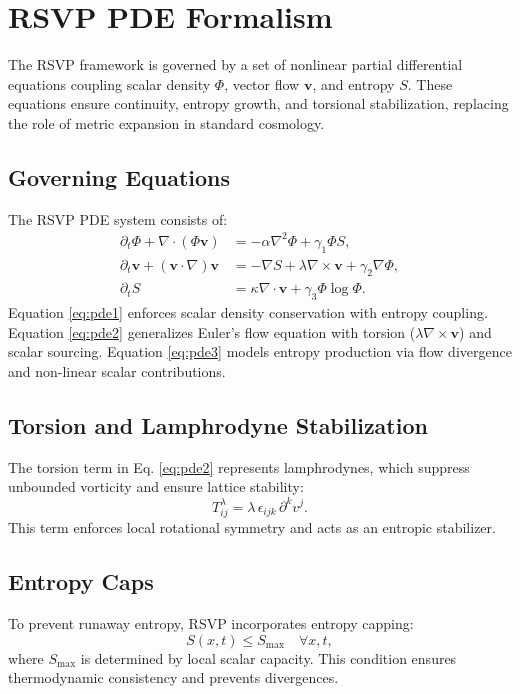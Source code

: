 \documentclass[12pt]{report}
\begin{document}
\chapter{RSVP PDE Formalism}
\label{chap:pde-formalism}
The RSVP framework is governed by a set of nonlinear partial differential equations coupling scalar density \(\Phi\), vector flow \(\mathbf{v}\), and entropy \(S\). These equations ensure continuity, entropy growth, and torsional stabilization, replacing the role of metric expansion in standard cosmology.

\section{Governing Equations}
The RSVP PDE system consists of:
\begin{align}
\partial_t \Phi + \nabla \cdot (\Phi \mathbf{v}) &= -\alpha \nabla^2 \Phi + \gamma_1 \Phi S, \label{eq:pde1} \\
\partial_t \mathbf{v} + (\mathbf{v}\cdot\nabla)\mathbf{v} &= -\nabla S + \lambda \nabla \times \mathbf{v} + \gamma_2 \nabla \Phi, \label{eq:pde2} \\
\partial_t S &= \kappa \nabla \cdot \mathbf{v} + \gamma_3 \Phi \log \Phi. \label{eq:pde3}
\end{align}
Equation \eqref{eq:pde1} enforces scalar density conservation with entropy coupling. Equation \eqref{eq:pde2} generalizes Euler’s flow equation with torsion (\(\lambda \nabla \times \mathbf{v}\)) and scalar sourcing. Equation \eqref{eq:pde3} models entropy production via flow divergence and non-linear scalar contributions.

\section{Torsion and Lamphrodyne Stabilization}
The torsion term in Eq. \eqref{eq:pde2} represents lamphrodynes, which suppress unbounded vorticity and ensure lattice stability:
\begin{equation}
T_{ij}^\lambda = \lambda \, \epsilon_{ijk} \, \partial^k v^j.
\end{equation}
This term enforces local rotational symmetry and acts as an entropic stabilizer.

\section{Entropy Caps}
To prevent runaway entropy, RSVP incorporates entropy capping:
\begin{equation}
S(x,t) \leq S_{\text{max}} \quad \forall x,t,
\end{equation}
where \(S_{\text{max}}\) is determined by local scalar capacity. This condition ensures thermodynamic consistency and prevents divergences.
\end{document}
